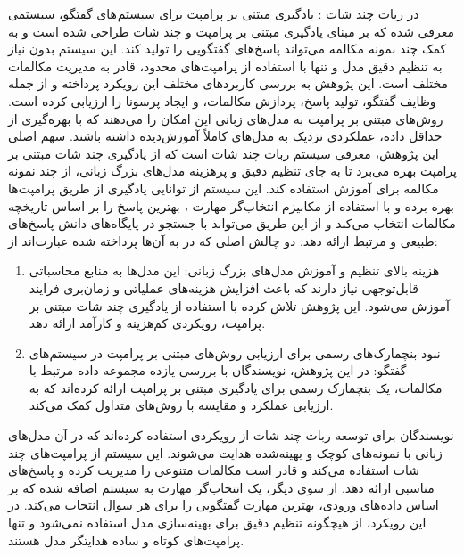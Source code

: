 در %
\cite{madotto2021few}
 ربات چند شات%
: یادگیری مبتنی بر پرامپت برای سیستم های گفتگو، سیستمی معرفی شده که بر مبنای یادگیری مبتنی بر پرامپت و چند شات طراحی شده است و به کمک چند نمونه مکالمه می‌تواند پاسخ‌های گفتگویی را تولید کند. این سیستم بدون نیاز به تنظیم دقیق مدل و تنها با استفاده از پرامپت‌های محدود، قادر به مدیریت مکالمات مختلف است. این پژوهش به بررسی کاربردهای مختلف این رویکرد پرداخته و از جمله وظایف گفتگو، تولید پاسخ، پردازش مکالمات، و ایجاد پرسونا را ارزیابی کرده است. روش‌های مبتنی بر پرامپت به مدل‌های زبانی این امکان را می‌دهند که با بهره‌گیری از حداقل داده، عملکردی نزدیک به مدل‌های کاملاً آموزش‌دیده داشته باشند.
\newline
سهم اصلی این پژوهش، معرفی سیستم ربات چند شات است که از یادگیری چند شات مبتنی بر پرامپت بهره می‌برد تا به جای تنظیم دقیق و پرهزینه مدل‌های بزرگ زبانی، از چند نمونه مکالمه برای آموزش استفاده کند. این سیستم از توانایی یادگیری از طریق پرامپت‌ها بهره برده و با استفاده از مکانیزم 
انتخاب‌گر مهارت%
، بهترین پاسخ را بر اساس تاریخچه مکالمات انتخاب می‌کند و از این طریق می‌تواند با جستجو در پایگاه‌های دانش پاسخ‌های طبیعی و مرتبط ارائه دهد.
\newline
دو چالش اصلی که در%
\cite{madotto2021few}
 به آن‌ها پرداخته شده عبارت‌اند از: 
\begin{enumerate}
\item
 هزینه بالای تنظیم و آموزش مدل‌های بزرگ زبانی: این مدل‌ها به منابع محاسباتی قابل‌توجهی نیاز دارند که باعث افزایش 
هزینه‌های عملیاتی و زمان‌بری فرایند آموزش می‌شود. این پژوهش تلاش کرده با استفاده از یادگیری چند شات مبتنی بر پرامپت، رویکردی کم‌هزینه و کارآمد ارائه دهد.
\item
نبود بنچمارک‌های رسمی برای ارزیابی روش‌های مبتنی بر پرامپت در سیستم‌های گفتگو: در این پژوهش، نویسندگان با بررسی یازده مجموعه داده مرتبط با مکالمات، یک بنچمارک رسمی برای یادگیری مبتنی بر پرامپت ارائه کرده‌اند که به ارزیابی عملکرد و مقایسه با روش‌های متداول کمک می‌کند.
\end{enumerate}

نویسندگان برای توسعه ربات چند شات از رویکردی استفاده کرده‌اند که در آن مدل‌های زبانی با نمونه‌های کوچک و بهینه‌شده هدایت می‌شوند. این سیستم از پرامپت‌های چند شات استفاده می‌کند و قادر است مکالمات متنوعی را مدیریت کرده و پاسخ‌های مناسبی ارائه دهد. از سوی دیگر، یک انتخاب‌گر مهارت به سیستم اضافه شده که بر اساس داده‌های ورودی، بهترین مهارت گفتگویی را برای هر سوال انتخاب می‌کند. در این رویکرد، از هیچگونه تنظیم دقیق برای بهینه‌سازی مدل استفاده نمی‌شود و تنها پرامپت‌های کوتاه و ساده هدایتگر مدل هستند.


